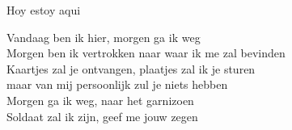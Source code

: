 \begin{song}[huayno]{Hoy estoy aqui}
\end{song}

\clearpage
\begin{translation}
Vandaag ben ik hier, morgen ga ik weg\\
Morgen ben ik vertrokken naar waar ik me zal bevinden\\
Kaartjes zal je ontvangen, plaatjes zal ik je sturen\\
maar van mij persoonlijk zul je niets hebben\\
Morgen ga ik weg, naar het garnizoen\\
Soldaat zal ik zijn, geef me jouw zegen
\end{translation}
